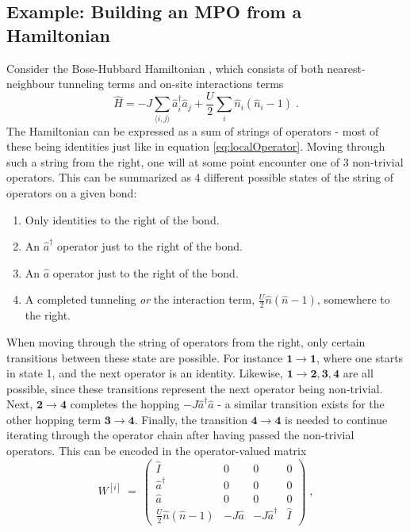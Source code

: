 \subsection{Example: Building an MPO from a Hamiltonian}
Consider the Bose-Hubbard Hamiltonian , which consists of both nearest-neighbour tunneling terms and on-site interactions terms
\begin{equation}
	\hat{H} = - J \sum_{\langle i,j \rangle} \hat{a}_{i}^{\dag} \hat{a}_{j} + \frac{U}{2} \sum_{i} \hat{n}_i \left( \hat{n}_i -1 \right) \; .
	\label{eq:BHhamil}
\end{equation}
The Hamiltonian can be expressed as a sum of strings of operators - most of these being identities just like in equation \ref{eq:localOperator}. Moving through such a string from the right, one will at some point encounter one of 3 non-trivial operators. This can be summarized as 4 different possible states of the string of operators on a given bond:
\begin{enumerate}
	\item
	Only identities to the right of the bond.
	\item
	An $\hat{a}^{\dag}$ operator just to the right of the bond.
	\item
	An $\hat{a}$ operator just to the right of the bond.
	\item
	A completed tunneling \textit{or} the interaction term, $\frac{U}{2} \hat{n} \left( \hat{n} -1 \right)$, somewhere to the right.
\end{enumerate}
When moving through the string of operators from the right, only certain transitions between these state are possible. For instance $\boldsymbol{1 \rightarrow 1}$, where one starts in state 1, and the next operator is an identity. Likewise, $\boldsymbol{1 \rightarrow 2,3,4}$ are all possible, since these transitions represent the next operator being non-trivial. Next, $\boldsymbol{2 \rightarrow 4}$ completes the hopping $-J \hat{a}^{\dag} \hat{a}$ - a similar transition exists for the other hopping term $\boldsymbol{3 \rightarrow 4}$. Finally, the transition $\boldsymbol{4 \rightarrow 4}$ is needed to continue iterating through the operator chain after having passed the non-trivial operators. This can be encoded in the operator-valued matrix
\begin{equation}
 W^{[i]} \: = \: \begin{pmatrix}
\hat{I} & 0 & 0 & 0  \\
\hat{a}^{\dag} & 0 & 0 & 0  \\
\hat{a} & 0 & 0 & 0 \\
\frac{U}{2} \hat{n} \left( \hat{n} -1 \right) & -J \hat{a} & -J \hat{a}^{\dag} &  \hat{I}
\end{pmatrix} \; ,
\label{eq:MPOmatrix}
\end{equation}
